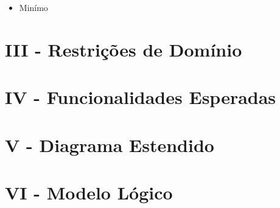 \documentclass[a4paper]{article}
\begin{document}
\begin{itemize}
    \item Minímo
\end{itemize}

\section*{III - Restrições de Domínio}

\section*{IV - Funcionalidades Esperadas}

\section*{V - Diagrama Estendido}

\section*{VI - Modelo Lógico}
\end{document}
